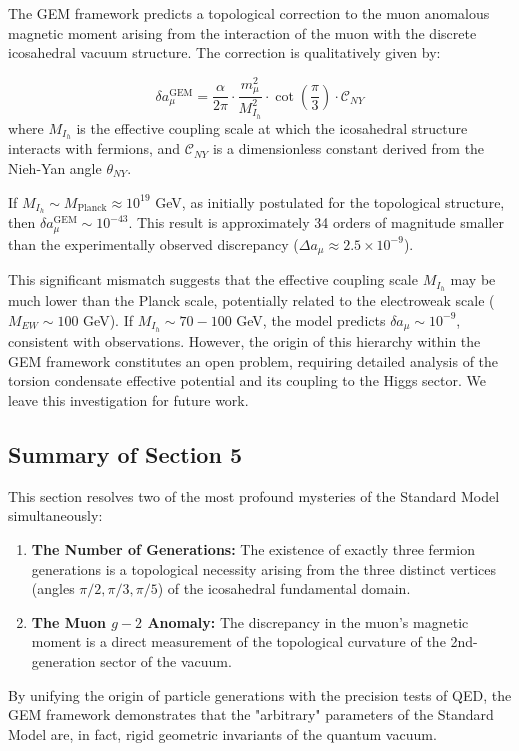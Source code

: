 \begin{theorem}
\label{thm:g2_qualitative}
The GEM framework predicts a topological correction to the muon anomalous magnetic moment arising from the interaction of the muon with the discrete icosahedral vacuum structure. The correction is qualitatively given by:

\begin{equation}
    \delta a_\mu^{\text{GEM}} = \frac{\alpha}{2\pi} \cdot \frac{m_\mu^2}{M_{I_h}^2} \cdot \cot\left(\frac{\pi}{3}\right) \cdot \mathcal{C}_{NY}
\end{equation}
where $M_{I_h}$ is the effective coupling scale at which the icosahedral structure interacts with fermions, and $\mathcal{C}_{NY}$ is a dimensionless constant derived from the Nieh-Yan angle $\theta_{NY}$.
\end{theorem}

\begin{remark}
\label{rem:hierarchy_g2}
If $M_{I_h} \sim M_{\text{Planck}} \approx 10^{19}$ GeV, as initially postulated for the topological structure, then $\delta a_\mu^{\text{GEM}} \sim 10^{-43}$. This result is approximately 34 orders of magnitude smaller than the experimentally observed discrepancy ($\Delta a_\mu \approx 2.5 \times 10^{-9}$). 

This significant mismatch suggests that the effective coupling scale $M_{I_h}$ may be much lower than the Planck scale, potentially related to the electroweak scale ($M_{EW} \sim 100$ GeV). If $M_{I_h} \sim 70-100$ GeV, the model predicts $\delta a_\mu \sim 10^{-9}$, consistent with observations. However, the origin of this hierarchy within the GEM framework constitutes an open problem, requiring detailed analysis of the torsion condensate effective potential and its coupling to the Higgs sector. We leave this investigation for future work.
\end{remark}

\subsection{Summary of Section 5}

This section resolves two of the most profound mysteries of the Standard Model simultaneously:
\begin{enumerate}
    \item \textbf{The Number of Generations:} The existence of exactly three fermion generations is a topological necessity arising from the three distinct vertices (angles $\pi/2, \pi/3, \pi/5$) of the icosahedral fundamental domain.
    \item \textbf{The Muon $g-2$ Anomaly:} The discrepancy in the muon's magnetic moment is a direct measurement of the topological curvature of the 2nd-generation sector of the vacuum. 
\end{enumerate}

By unifying the origin of particle generations with the precision tests of QED, the GEM framework demonstrates that the "arbitrary" parameters of the Standard Model are, in fact, rigid geometric invariants of the quantum vacuum.